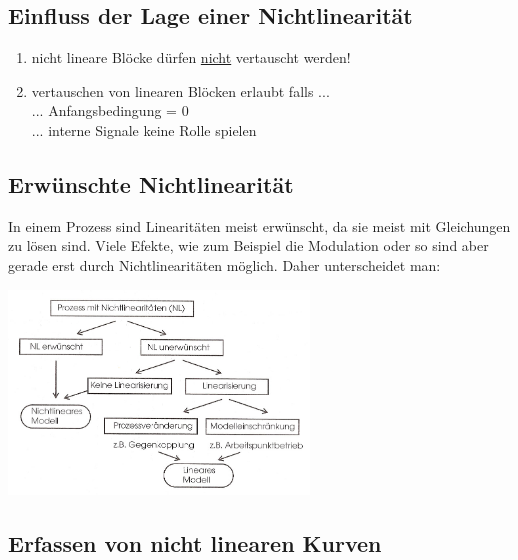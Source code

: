 	\subsection{Einfluss der Lage einer Nichtlinearität}
		\begin{enumerate}
			\item	nicht lineare Blöcke dürfen \underline{nicht} vertauscht werden!\\			\item vertauschen von linearen Blöcken erlaubt falls ...\\
								... Anfangsbedingung = 0\\
								... interne Signale keine Rolle spielen
		\end{enumerate}
	  	
	\subsection{Erwünschte Nichtlinearität }
		In einem Prozess sind Linearitäten meist erwünscht, da sie meist mit
		Gleichungen zu lösen sind.
		Viele Efekte, wie zum Beispiel die Modulation oder so sind aber gerade erst
		durch Nichtlinearitäten möglich. Daher unterscheidet man:\\
	\begin{minipage}[c]{8cm}
		\includegraphics[width=8cm]{./bilder/Liste_Nichtlinearitaeten.jpg}
	\end{minipage}

\newpage
	
\subsection{Erfassen von nicht linearen Kurven}
